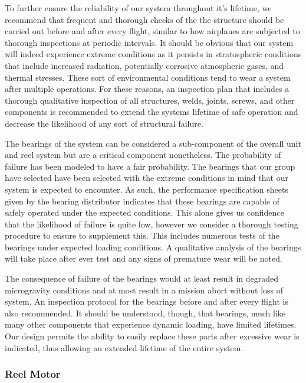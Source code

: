 To further ensure the reliability of our system throughout it's lifetime, we recommend that frequent and thorough checks of the the structure should be carried out before and after every flight, similar to how airplanes are subjected to thorough inspections at periodic intervals. It should be obvious that our system will indeed experience extreme conditions as it persists in stratospheric conditions that include increased radiation, potentially corrosive atmospheric gases, and thermal stresses. These sort of environmental conditions tend to wear a system after multiple operations. For these reasons, an inspection plan that includes a thorough qualitative inspection of all structures, welds, joints, screws, and other components is recommended to extend the systems lifetime of safe operation and decrease the likelihood of any sort of structural failure. 

The bearings of the system can be considered a sub-component of the overall unit and reel system but are a critical component nonetheless. The probability of failure has been modeled to have a fair probability. The bearings that our group have selected have been selected with the extreme conditions in mind that our system is expected to encounter. As such, the performance specification sheets given by the bearing distributor indicates that these bearings are capable of safely operated under the expected conditions. This alone gives us confidence that the likelihood of failure is quite low, however we consider a thorough testing procedure to ensure to supplement this. This includes numerous tests of the bearings under expected loading conditions. A qualitative analysis of the bearings will take place after ever test and any signs of premature wear will be noted. 

The consequence of failure of the bearings would at least result in degraded microgravity conditions and at most result in a mission abort without loss of system. An inspection protocol for the bearings before and after every flight is also recommended. It should be understood, though, that bearings, much like many other components that experience dynamic loading, have limited lifetimes. Our design permits the ability to easily replace these parts after excessive wear is indicated, thus allowing an extended lifetime of the entire system. 


\subsubsection{Reel Motor}

